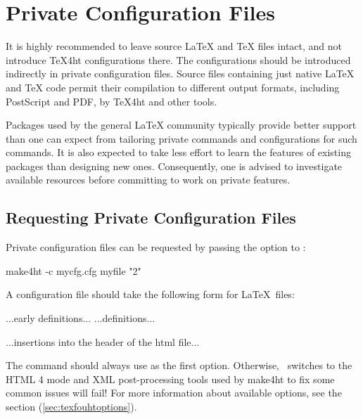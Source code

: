 \section{Private Configuration Files}\label{sec:private-configuration}

It is highly recommended to leave source LaTeX and TeX files intact, and not
introduce TeX4ht configurations there. The configurations should be introduced
indirectly in private configuration files. Source files containing just native
LaTeX and TeX code permit their compilation to different output formats,
including PostScript and PDF, by TeX4ht and other tools.

Packages used by the general LaTeX community typically provide better support
than one can expect from tailoring private commands and configurations for such
commands. It is also expected to take less effort to learn the features of
existing packages than designing new ones. Consequently, one is advised to
investigate available resources before committing to work on private features. 

\subsection{Requesting Private Configuration Files}

Private configuration files can be requested by passing the 
option to :

\begin{shellcommand}
make4ht -c mycfg.cfg myfile "2"
\end{shellcommand}


A configuration file should take the following form for \LaTeX\ files:

\begin{texsource}
...early definitions...
...definitions...

...insertions into the header of the html file...
\EndPreamble
\end{texsource}

The \texcommand{\Preamble} command should always use  
as the first option. Otherwise, \texfourht\ switches to the HTML 4 mode and XML
post-processing tools used by make4ht to fix some common issues will fail! For 
more information about available options, see the  
section (\ref{sec:texfouhtoptions}).

\begin{texsource}
 
\EndPreamble 
\end{texsource}

